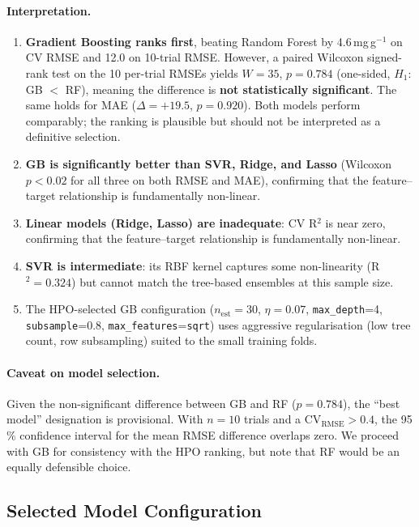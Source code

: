 \documentclass[12pt,a4paper]{article}
\begin{document}
\paragraph{Interpretation.}
\begin{enumerate}[leftmargin=*]
  \item \textbf{Gradient Boosting ranks first}, beating Random
        Forest by 4.6\,mg\,g$^{-1}$ on CV RMSE and 12.0 on 10-trial RMSE.
        However, a paired Wilcoxon signed-rank test on the 10 per-trial
        RMSEs yields $W=35$, $p=0.784$ (one-sided, $H_1$: GB $<$ RF),
        meaning the difference is \textbf{not statistically significant}.
        The same holds for MAE ($\Delta = +19.5$, $p = 0.920$).
        Both models perform comparably; the ranking is plausible but
        should not be interpreted as a definitive selection.
  \item \textbf{GB is significantly better than SVR, Ridge, and Lasso}
        (Wilcoxon $p < 0.02$ for all three on both RMSE and MAE), confirming
        that the feature--target relationship is fundamentally non-linear.
  \item \textbf{Linear models (Ridge, Lasso) are inadequate}: CV R$^2$ is
        near zero, confirming that the feature--target relationship is
        fundamentally non-linear.
  \item \textbf{SVR is intermediate}: its RBF kernel captures some
        non-linearity (R$^2 = 0.324$) but cannot match the
        tree-based ensembles at this sample size.
  \item The HPO-selected GB configuration ($n_\text{est}=30$,
        $\eta=0.07$, \texttt{max\_depth}=4, \texttt{subsample}=0.8,
        \texttt{max\_features}=\texttt{sqrt}) uses aggressive
        regularisation (low tree count, row subsampling) suited to the
        small training folds.
\end{enumerate}

\paragraph{Caveat on model selection.}
Given the non-significant difference between GB and RF ($p = 0.784$), the
``best model'' designation is provisional.  With $n = 10$ trials and a
CV$_\text{RMSE} > 0.4$, the 95\,\% confidence interval for the mean RMSE
difference overlaps zero.  We proceed with GB for consistency with the
HPO ranking, but note that RF would be an equally defensible choice.

\subsection{Selected Model Configuration}
\end{document}
